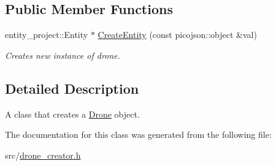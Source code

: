 \subsection*{Public Member Functions}
\begin{DoxyCompactItemize}
\item 
\mbox{\label{classcsci3081_1_1DroneCreator_af00dafce3a19416285279d667306fc9a}} 
entity\+\_\+project\+::\+Entity $\ast$ \hyperlink{classcsci3081_1_1DroneCreator_af00dafce3a19416285279d667306fc9a}{Create\+Entity} (const picojson\+::object \&val)
\begin{DoxyCompactList}\small\item\em Creates new instance of drone. \end{DoxyCompactList}\end{DoxyCompactItemize}


\subsection{Detailed Description}
A class that creates a \hyperlink{classcsci3081_1_1Drone}{Drone} object. 

The documentation for this class was generated from the following file\+:\begin{DoxyCompactItemize}
\item 
src/\hyperlink{drone__creator_8h}{drone\+\_\+creator.\+h}\end{DoxyCompactItemize}
